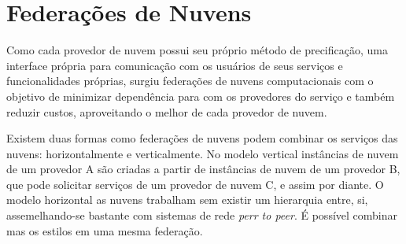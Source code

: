 \section{Federações de Nuvens}

Como cada provedor de nuvem possui seu próprio método de precificação, uma interface própria para comunicação com os usuários de seus serviços e funcionalidades próprias, surgiu federações de nuvens computacionais com o objetivo de minimizar dependência para com os provedores do serviço e também reduzir custos, aproveitando o melhor de cada provedor de nuvem.

Existem duas formas como federações de nuvens podem combinar os serviços das nuvens: horizontalmente e verticalmente\cite{5557976}. No modelo vertical instâncias de nuvem de um provedor A são criadas a partir de instâncias de nuvem de um provedor B, que pode solicitar serviços de um provedor de nuvem C, e assim por diante. O modelo horizontal as nuvens trabalham sem existir um hierarquia entre, si, assemelhando-se bastante com sistemas de rede \textit{perr to peer}. É possível combinar mas os estilos em uma mesma federação.


